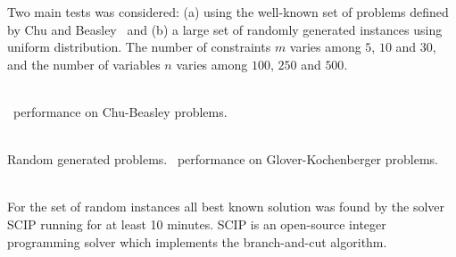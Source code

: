 Two main tests was considered:
(a) using the well-known set of problems defined by Chu and Beasley~\cite{Chu-Beasley-1998}
and (b) a large set of randomly generated instances using uniform distribution.
The number of constraints $m$ varies among $5$, $10$ and $30$, and the number
of variables $n$ varies among $100$, $250$ and $500$.
\\[2mm]
\begin{minipage}[c]{0.4\linewidth}
  \begin{center}
    
        \\[2mm]
        \scecore~performance on Chu-Beasley problems.
  \end{center}
\end{minipage}
\begin{minipage}[c]{0.6\linewidth}
  \begin{center}
    
        \\[2mm]
        Random generated problems.
        \scecore~performance on Glover-Kochenberger problems.
  \end{center}
\end{minipage}
\\[2mm]
For the set of random instances all best known solution was found by the solver
SCIP running for at least 10 minutes.
SCIP is an open-source integer programming solver which
implements the branch-and-cut algorithm.
